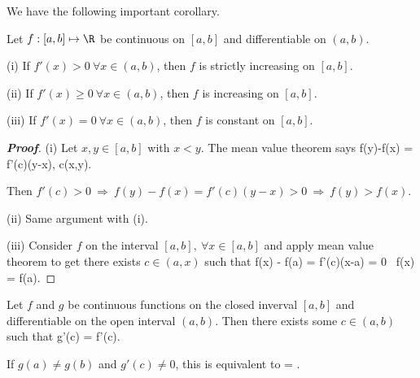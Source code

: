 We have the following important corollary.

\begin{corollary}\label{cor:derivative_greater_equal_to_zero}%
Let $f: [a,b]\mapsto \R$ be continuous on $[a,b]$ and differentiable on $(a,b)$. %
\ben
\item [(i)] If $f'(x)>0 \ \forall x\in (a,b)$, then $f$ is strictly increasing on $[a,b]$.
\item [(ii)] If $f'(x)\geq 0 \ \forall x\in (a,b)$, then $f$ is increasing on $[a,b]$.
\item [(iii)] If $f'(x)=0 \ \forall x\in (a,b)$, then $f$ is constant on $[a,b]$.
\een
\end{corollary}

\begin{proof}[{\bf Proof}]
\ben
\item [(i)] Let $x,y\in[a,b]$ with $x<y$. The mean value theorem says
\be
f(y)-f(x) = f'(c)(y-x), \quad \exists c\in (x,y).
\ee

Then $f'(c)>0 \ \Rightarrow \ f(y)-f(x) = f'(c)(y-x) >0 \ \Rightarrow \ f(y) > f(x)$.

\item [(ii)] Same argument with (i).
\item [(iii)] Consider $f$ on the interval $[a,b],\ \forall x\in[a,b]$ and apply mean value theorem to get there exists $c\in (a,x)$ such that
\be
f(x) - f(a) = f'(c)(x-a) = 0 \Rightarrow \ f(x) = f(a).
\ee
\een
\end{proof}

\begin{theorem}\label{thm:mean_value_cauchy}%
Let $f$ and $g$ be continuous functions on the closed inverval $[a,b]$ and differentiable on the open interval $(a,b)$. Then there exists some $c\in (a,b)$ such that
\be
{}g'(c) = f'(c).
\ee

If $g(a)\neq g(b)$ and $g'(c) \neq 0$, this is equivalent to
\be
{} = .
\ee
\end{theorem}


